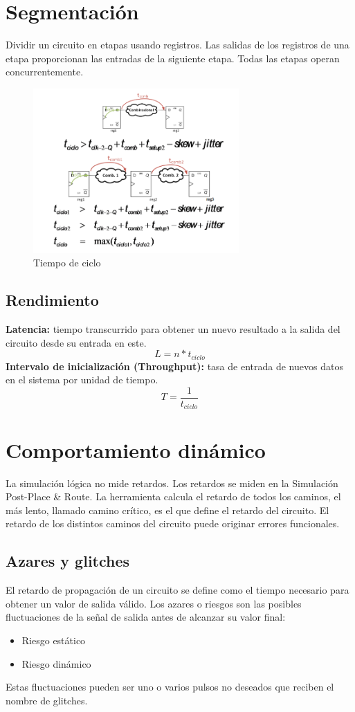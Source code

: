 \section{Segmentación}
Dividir un circuito en etapas usando registros. Las salidas de los registros de una etapa proporcionan las entradas de la siguiente etapa. Todas las etapas operan concurrentemente.
\begin{figure}[H]
	\centering
	\includegraphics[width=0.7\textwidth]{images/Tema_2/segmentacion2.PNG}
	\caption{Tiempo de ciclo}
\end{figure}

\subsection{Rendimiento}
\textbf{Latencia:} tiempo transcurrido para obtener un nuevo resultado a la salida del circuito desde su entrada en este.
\[
	L = n*t_{ciclo}
\]
\textbf{Intervalo de inicialización (Throughput):} tasa de entrada de nuevos datos en el sistema por unidad de tiempo.
\[
	T = \frac{1}{t_{ciclo}}
\]

\section{Comportamiento dinámico}
La simulación lógica no mide retardos. Los retardos se miden en la Simulación Post-Place \& Route. La herramienta calcula el retardo de todos los caminos, el más lento, llamado camino crítico, es el que define el retardo del circuito. El retardo de los distintos caminos del circuito puede originar errores funcionales.

\subsection{Azares y glitches}
El retardo de propagación de un circuito se define como el tiempo necesario para obtener un valor de salida válido. Los azares o riesgos son las posibles fluctuaciones de la señal de salida antes de alcanzar su valor final:
\begin{itemize}
	\item Riesgo estático
	\item Riesgo dinámico
\end{itemize}
Estas fluctuaciones pueden ser uno o varios pulsos no deseados que reciben el nombre de glitches.

